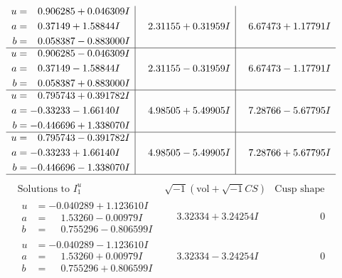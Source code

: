 \documentclass[1p]{elsarticle_modified}
\theoremstyle{definition}
\newcommand{\I}{\sqrt{-1}}
\begin{document}
$$\begin{array}{c|c|c}
\begin{aligned}
u &= \phantom{-}0.906285 + 0.046309 I \\
a &= \phantom{-}0.37149 + 1.58844 I \\
b &= \phantom{-}0.058387 - 0.883000 I\end{aligned}
 & \phantom{-}2.31155 + 0.31959 I & \phantom{-}6.67473 + 1.17791 I \\ \hline\begin{aligned}
u &= \phantom{-}0.906285 - 0.046309 I \\
a &= \phantom{-}0.37149 - 1.58844 I \\
b &= \phantom{-}0.058387 + 0.883000 I\end{aligned}
 & \phantom{-}2.31155 - 0.31959 I & \phantom{-}6.67473 - 1.17791 I \\ \hline\begin{aligned}
u &= \phantom{-}0.795743 + 0.391782 I \\
a &= -0.33233 - 1.66140 I \\
b &= -0.446696 + 1.338070 I\end{aligned}
 & \phantom{-}4.98505 + 5.49905 I & \phantom{-}7.28766 - 5.67795 I \\ \hline\begin{aligned}
u &= \phantom{-}0.795743 - 0.391782 I \\
a &= -0.33233 + 1.66140 I \\
b &= -0.446696 - 1.338070 I\end{aligned}
 & \phantom{-}4.98505 - 5.49905 I & \phantom{-}7.28766 + 5.67795 I\\
 \hline 
 \end{array}$$\newpage$$\begin{array}{c|c|c}  
\text{Solutions to }I^u_{1}& \I (\text{vol} + \sqrt{-1}CS) & \text{Cusp shape}\\
 \hline 
\begin{aligned}
u &= -0.040289 + 1.123610 I \\
a &= \phantom{-}1.53260 - 0.00979 I \\
b &= \phantom{-}0.755296 - 0.806599 I\end{aligned}
 & \phantom{-}3.32334 + 3.24254 I & \phantom{-0.000000 } 0 \\ \hline\begin{aligned}
u &= -0.040289 - 1.123610 I \\
a &= \phantom{-}1.53260 + 0.00979 I \\
b &= \phantom{-}0.755296 + 0.806599 I\end{aligned}
 & \phantom{-}3.32334 - 3.24254 I & \phantom{-0.000000 } 0 \\ \hline\begin{aligned}

\end{aligned}
\end{array}$$
\end{document}
